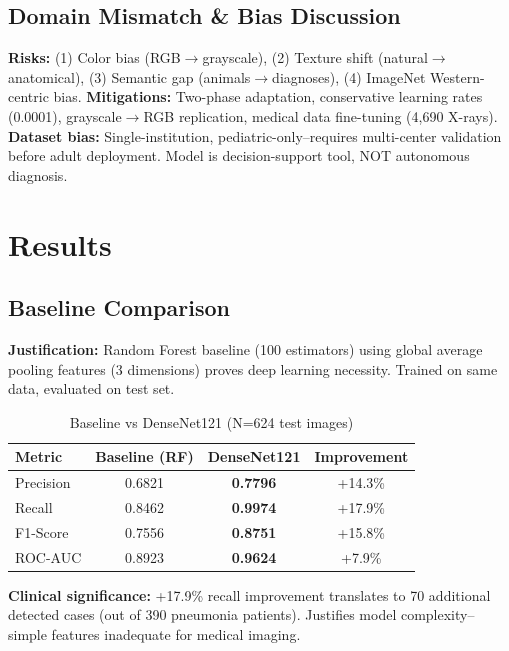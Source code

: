 \documentclass[12pt,a4paper]{article}
\begin{document}
\subsection{Domain Mismatch \& Bias Discussion}
\textbf{Risks:} (1) Color bias (RGB$\rightarrow$grayscale), (2) Texture shift (natural$\rightarrow$anatomical), (3) Semantic gap (animals$\rightarrow$diagnoses), (4) ImageNet Western-centric bias. \textbf{Mitigations:} Two-phase adaptation, conservative learning rates (0.0001), grayscale$\rightarrow$RGB replication, medical data fine-tuning (4,690 X-rays). \textbf{Dataset bias:} Single-institution, pediatric-only--requires multi-center validation before adult deployment. Model is decision-support tool, NOT autonomous diagnosis.

\section{Results}

\subsection{Baseline Comparison}
\textbf{Justification:} Random Forest baseline (100 estimators) using global average pooling features (3 dimensions) proves deep learning necessity. Trained on same data, evaluated on test set.

\begin{table}[H]
\centering
\caption{Baseline vs DenseNet121 (N=624 test images)}
\begin{tabular}{@{}lccc@{}}
\toprule
\textbf{Metric} & \textbf{Baseline (RF)} & \textbf{DenseNet121} & \textbf{Improvement} \\
\midrule
Precision & 0.6821 & \textbf{0.7796} & +14.3\% \\
Recall & 0.8462 & \textbf{0.9974} & +17.9\% \\
F1-Score & 0.7556 & \textbf{0.8751} & +15.8\% \\
ROC-AUC & 0.8923 & \textbf{0.9624} & +7.9\% \\
\bottomrule
\end{tabular}
\end{table}

\textbf{Clinical significance:} +17.9\% recall improvement translates to 70 additional detected cases (out of 390 pneumonia patients). Justifies model complexity--simple features inadequate for medical imaging.
\end{document}
